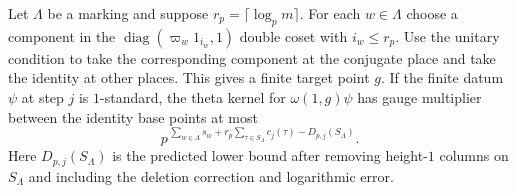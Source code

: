 \begin{lemma}
\label{lem:a-marked-neighbor-jet-gauge}
\emitthmsource
Let $\Lambda$ be a marking and suppose $r_p=\lceil\log_p m\rceil$. For each $w\in\Lambda$ choose a component in the $\operatorname{diag}(\varpi_w1_{i_w},1)$ double coset with $i_w\le r_p$. Use the unitary condition to take the corresponding component at the conjugate place and take the identity at other places. This gives a finite target point $g$. If the finite datum $\psi$ at step $j$ is $1$-standard, the theta kernel for $\omega(1,g)\psi$ has gauge multiplier between the identity base points at most
\[
 p^{\,\sum_{w\in\Lambda}s_w+
      r_p\sum_{\tau\in S_\Lambda}c_j(\tau)-D_{p,j}(S_\Lambda)}.
\]
Here $D_{p,j}(S_\Lambda)$ is the predicted lower bound after removing height-$1$ columns on $S_\Lambda$ and including the deletion correction and logarithmic error.
\end{lemma}
